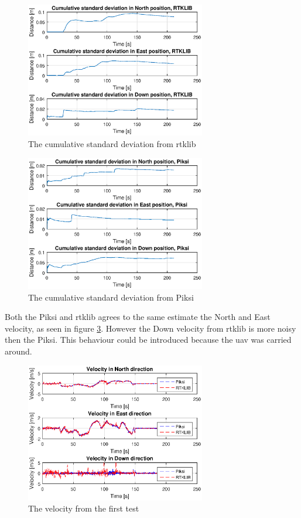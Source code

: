 \begin{figure}[H]
	\centering
		\includegraphics[width=0.7\textwidth]{figs/plots/stdRtklibWalk1.eps}
		\caption{The cumulative standard deviation from \gls{rtklib}}
		\label{figure:stdRTK}
\end{figure}
\begin{figure}[H]
	\centering
		\includegraphics[width=0.7\textwidth]{figs/plots/stdPiksiWalk1.eps}
		\caption{The cumulative standard deviation from Piksi}
		\label{figure:stdPiksi}
\end{figure}
Both the Piksi and \gls{rtklib} agrees to the same estimate the North and East velocity, as seen in figure \ref{figure:VelocityWalk1}. However the Down velocity from \gls{rtklib} is more noisy then the Piksi. This behaviour could be introduced because the \gls{uav} was carried around.
\begin{figure}[H]
	\centering
		\includegraphics[width=0.7\textwidth]{figs/plots/velocityWalk1.eps}
		\caption{The velocity from the first test}
		\label{figure:VelocityWalk1}
\end{figure}
